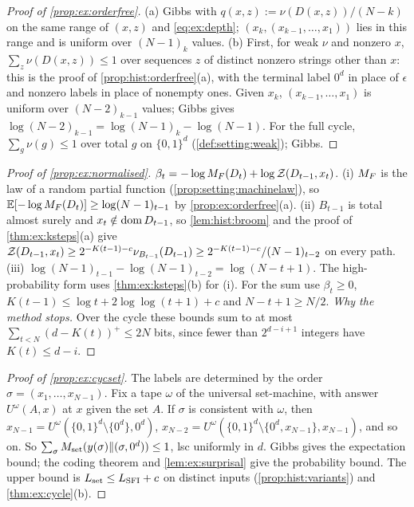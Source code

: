 \begin{proof}[Proof of \cref{prop:ex:orderfree}]
(a) Gibbs with $q(x,z):=\nu(D(x,z))/(N-k)$ on the same range of $(x,z)$ and \eqref{eq:ex:depth}; $(x_k,(x_{k-1},\dots,x_1))$ lies in this range and is uniform over $(N-1)_k$ values.
(b) First, for weak $\nu$ and nonzero $x$, $\sum_z\nu(D(x,z))\le1$ over sequences $z$ of distinct nonzero strings other than $x$: this is the proof of \cref{prop:hist:orderfree}(a), with the terminal label $0^d$ in place of $\epsilon$ and nonzero labels in place of nonempty ones. Given $x_k$, $(x_{k-1},\dots,x_1)$ is uniform over $(N-2)_{k-1}$ values; Gibbs gives $\log(N-2)_{k-1}=\log(N-1)_k-\log(N-1)$. For the full cycle, $\sum_g\nu(g)\le1$ over total $g$ on $\{0,1\}^d$ (\cref{def:setting:weak}); Gibbs.
\end{proof}

\begin{proof}[Proof of \cref{prop:ex:normalised}]
$\beta_t=-\log M_{F}(D_t)+\log\mathcal{Z}(D_{t-1},x_t)$. (i) $M_{F}$ is the law of a random partial function (\cref{prop:setting:machinelaw}), so $\mathbb{E}[-\log M_{F}(D_t)]\ge\log(N-1)_{t-1}$ by \cref{prop:ex:orderfree}(a). (ii) $B_{t-1}$ is total almost surely and $x_t\notin\operatorname{dom} D_{t-1}$, so \cref{lem:hist:broom} and the proof of \cref{thm:ex:ksteps}(a) give $\mathcal{Z}(D_{t-1},x_t)\ge2^{-K(t-1)-c}\nu_{B_{t-1}}(D_{t-1})\ge2^{-K(t-1)-c}/(N-1)_{t-2}$ on every path. (iii) $\log(N-1)_{t-1}-\log(N-1)_{t-2}=\log(N-t+1)$. The high-probability form uses \cref{thm:ex:ksteps}(b) for (i). For the sum use $\beta_t\ge0$, $K(t-1)\le\log t+2\log\log(t+1)+c$ and $N-t+1\ge N/2$.
\emph{Why the method stops.} Over the cycle these bounds sum to at most $\sum_{t<N}(d-K(t))^+\le2N$ bits, since fewer than $2^{d-i+1}$ integers have $K(t)\le d-i$.
\end{proof}

\begin{proof}[Proof of \cref{prop:ex:cycset}]
The labels are determined by the order $\sigma=(x_1,\dots,x_{N-1})$. Fix a tape $\omega$ of the universal set-machine, with answer $U^\omega(A,x)$ at $x$ given the set $A$. If $\sigma$ is consistent with $\omega$, then $x_{N-1}=U^\omega(\{0,1\}^d\setminus\{0^d\},0^d)$, $x_{N-2}=U^\omega(\{0,1\}^d\setminus\{0^d,x_{N-1}\},x_{N-1})$, and so on. So $\sum_\sigma M_{\mathrm{set}}(y(\sigma)\Vert(\sigma,0^d))\le1$, lsc uniformly in $d$. Gibbs gives the expectation bound; the coding theorem and \cref{lem:ex:surprisal} give the probability bound. The upper bound is $L_{\rm set}\le L_{\mathrm{SFI}}+c$ on distinct inputs (\cref{prop:hist:variants}) and \cref{thm:ex:cycle}(b).
\end{proof}

